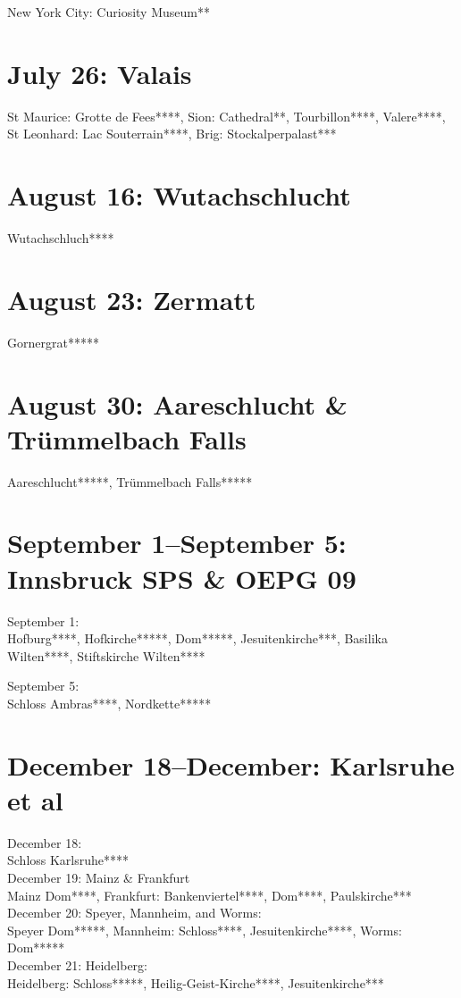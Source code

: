 New York City: Curiosity Museum**

\section{July 26: Valais}
\label{2009:Valais}

St Maurice: Grotte de Fees****, Sion: Cathedral**, Tourbillon****, Valere****, St Leonhard: Lac Souterrain****, Brig: Stockalperpalast***

\section{August 16: Wutachschlucht}
\label{2009:Wutachschlucht}

Wutachschluch****

\section{August 23: Zermatt}
\label{2009:Zermatt}

Gornergrat*****

\section{August 30: Aareschlucht \& Tr\"ummelbach Falls}
\label{2009:Aareschlucht}

Aareschlucht*****, Tr\"ummelbach Falls*****

\section{September 1--September 5: Innsbruck SPS \& OEPG 09}
\label{2009:Innsbruck}

September 1:\\

Hofburg****, Hofkirche*****, Dom*****, Jesuitenkirche***, Basilika Wilten****, Stiftskirche Wilten****

September 5:\\

Schloss Ambras****, Nordkette*****

\section{December 18--December: Karlsruhe et al}

December 18:\\
Schloss Karlsruhe****\\

December 19: Mainz \& Frankfurt\\
Mainz Dom****, Frankfurt: Bankenviertel****, Dom****, Paulskirche***\\

December 20: Speyer, Mannheim, and Worms:\\
Speyer Dom*****, Mannheim: Schloss****, Jesuitenkirche****, Worms: Dom*****\\

December 21: Heidelberg:\\
Heidelberg: Schloss*****, Heilig-Geist-Kirche****, Jesuitenkirche***